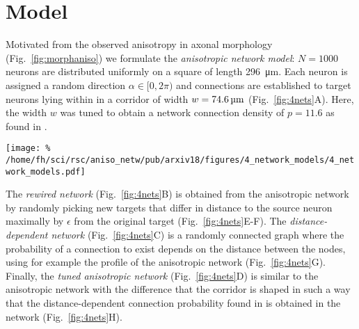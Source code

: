 
\vspace{-1.5cm}
\section*{Model}
\vspace{-0.2cm}

Motivated from the observed anisotropy in axonal morphology (Fig.~\ref{fig:morphaniso}) we formulate the \textit{anisotropic network model}: $N=1000$ neurons are distributed uniformly on a square of length \SI{296}{\micro\meter}. Each neuron is assigned a random direction $\alpha \in [0,2\pi)$ and connections are established to target neurons lying within in a corridor of width $w=\text{\SI{74.6}{\micro\meter}}$ (Fig.~\ref{fig:4nets}A). Here, the width $w$ was tuned to obtain a network connection density of $p=11.6$ as found in \cite{Song2005}.

\begin{center}\vspace{0.3cm}
  \texttt{[image: \%
    /home/fh/sci/rsc/aniso\_netw/pub/arxiv18/figures/4\_network\_models/4\_network\_models.pdf]}
  \label{fig:4nets}
\end{center}\vspace{2cm}

The \textit{rewired network} (Fig.~\ref{fig:4nets}B) is obtained from the anisotropic network by randomly picking new targets that differ in distance to the source neuron maximally by $\epsilon$ from the original target (Fig.~\ref{fig:4nets}E-F). The \textit{distance-dependent network} (Fig.~\ref{fig:4nets}C) is a randomly connected graph where the probability of a connection to exist depends on the distance between the nodes, using for example the profile of the anisotropic network (Fig.~\ref{fig:4nets}G). Finally, the \textit{tuned anisotropic network} (Fig.~\ref{fig:4nets}D) is similar to the anisotropic network with the difference that the corridor is shaped in such a way that the distance-dependent connection probability found in \cite{Perin2011} is obtained in the network (Fig.~\ref{fig:4nets}H).



